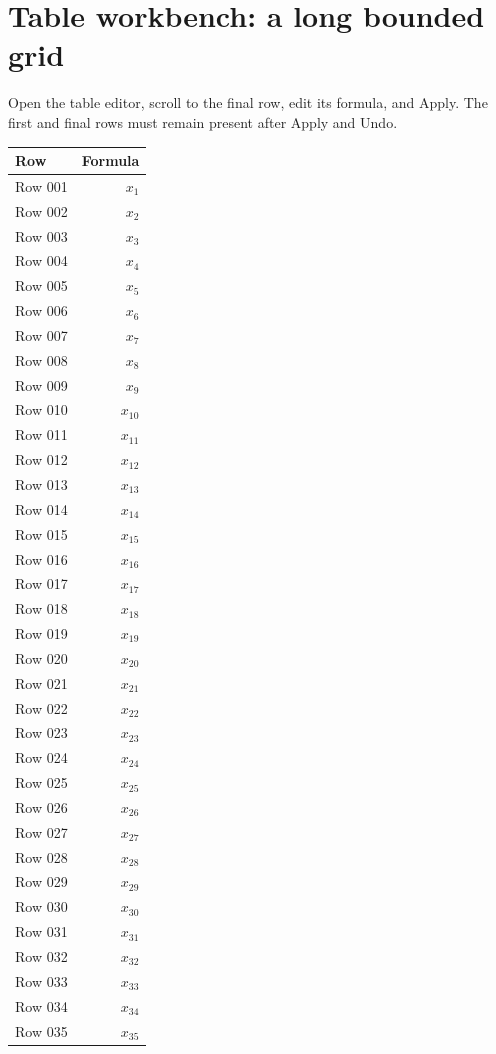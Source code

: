 \documentclass{article}
\begin{document}
\section*{Table workbench: a long bounded grid}
Open the table editor, scroll to the final row, edit its formula, and Apply.
The first and final rows must remain present after Apply and Undo.
\begin{longtable}{lr}
\toprule
Row & Formula \\
\midrule
Row 001 & $x_{1}$ \\
Row 002 & $x_{2}$ \\
Row 003 & $x_{3}$ \\
Row 004 & $x_{4}$ \\
Row 005 & $x_{5}$ \\
Row 006 & $x_{6}$ \\
Row 007 & $x_{7}$ \\
Row 008 & $x_{8}$ \\
Row 009 & $x_{9}$ \\
Row 010 & $x_{10}$ \\
Row 011 & $x_{11}$ \\
Row 012 & $x_{12}$ \\
Row 013 & $x_{13}$ \\
Row 014 & $x_{14}$ \\
Row 015 & $x_{15}$ \\
Row 016 & $x_{16}$ \\
Row 017 & $x_{17}$ \\
Row 018 & $x_{18}$ \\
Row 019 & $x_{19}$ \\
Row 020 & $x_{20}$ \\
Row 021 & $x_{21}$ \\
Row 022 & $x_{22}$ \\
Row 023 & $x_{23}$ \\
Row 024 & $x_{24}$ \\
Row 025 & $x_{25}$ \\
Row 026 & $x_{26}$ \\
Row 027 & $x_{27}$ \\
Row 028 & $x_{28}$ \\
Row 029 & $x_{29}$ \\
Row 030 & $x_{30}$ \\
Row 031 & $x_{31}$ \\
Row 032 & $x_{32}$ \\
Row 033 & $x_{33}$ \\
Row 034 & $x_{34}$ \\
Row 035 & $x_{35}$ \\

\end{longtable}
\end{document}
